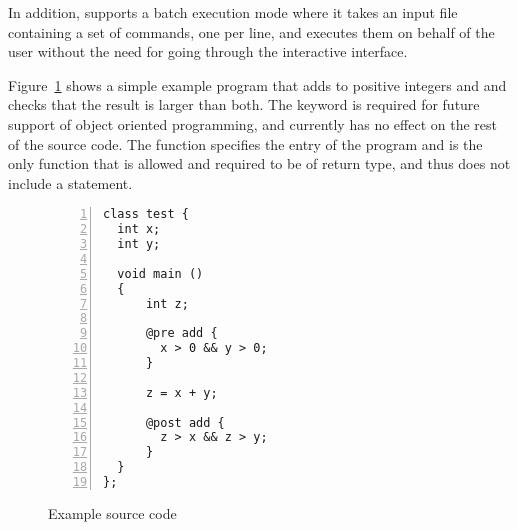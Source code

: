 In addition, \mytool{} supports a batch execution mode where it takes an input file containing a set of
commands, one per line, and executes them on behalf of the user without the need for going through the interactive
interface.

Figure~\ref{fig:example_code} shows a simple example program that adds to positive integers
 and  and checks that the result is larger than both. The  keyword
is required for future support of object oriented programming, and currently has no effect
on the rest of the source code. The  function specifies the entry of the program 
and is the only function that is allowed and required to be of  return type,
and thus does not include a  statement.
\begin{figure}[bt]
\centering
\begin{Verbatim}[fontsize=\relsize{-2.0}, numbersep=4pt,numbers=left,frame=lines]
class test {
  int x;
  int y;

  void main ()
  {
	  int z;

	  @pre add {
	    x > 0 && y > 0;
	  }

	  z = x + y;

	  @post add {
	    z > x && z > y;
	  }
  }
};
\end{Verbatim}
\caption{Example source code}
\label{fig:example_code}
\end{figure}


